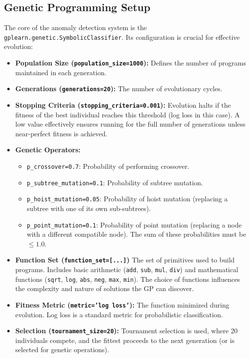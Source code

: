 \documentclass{article}
\begin{document}
\subsection{Genetic Programming Setup}
The core of the anomaly detection system is the \texttt{gplearn.genetic.SymbolicClassifier}. Its configuration is crucial for effective evolution:

\begin{itemize}
    \item \textbf{Population Size (\texttt{population\_size=1000}):} Defines the number of programs maintained in each generation.
    \item \textbf{Generations (\texttt{generations=20}):} The number of evolutionary cycles.
    \item \textbf{Stopping Criteria (\texttt{stopping\_criteria=0.001}):} Evolution halts if the fitness of the best individual reaches this threshold (log loss in this case). A low value effectively ensures running for the full number of generations unless near-perfect fitness is achieved.
    \item \textbf{Genetic Operators:}
        \begin{itemize}
            \item \texttt{p\_crossover=0.7}: Probability of performing crossover.
            \item \texttt{p\_subtree\_mutation=0.1}: Probability of subtree mutation.
            \item \texttt{p\_hoist\_mutation=0.05}: Probability of hoist mutation (replacing a subtree with one of its own sub-subtrees).
            \item \texttt{p\_point\_mutation=0.1}: Probability of point mutation (replacing a node with a different compatible node). The sum of these probabilities must be \(\le 1.0\).
        \end{itemize}
    \item \textbf{Function Set (\texttt{function\_set=[...]})} The set of primitives used to build programs. Includes basic arithmetic (\texttt{add}, \texttt{sub}, \texttt{mul}, \texttt{div}) and mathematical functions (\texttt{sqrt}, \texttt{log}, \texttt{abs}, \texttt{neg}, \texttt{max}, \texttt{min}). The choice of functions influences the complexity and nature of solutions the GP can discover.
    \item \textbf{Fitness Metric (\texttt{metric='log loss'}):} The function minimized during evolution. Log loss is a standard metric for probabilistic classification.
    \item \textbf{Selection (\texttt{tournament\_size=20}):} Tournament selection is used, where 20 individuals compete, and the fittest proceeds to the next generation (or is selected for genetic operations).

\end{itemize}
\end{document}
